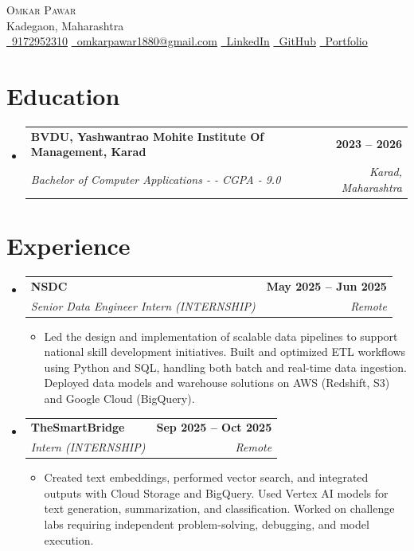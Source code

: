 \documentclass[letterpaper,11pt]{article}
\makeatletter
\newcommand{\resumeItem}[1]{
  \item\small{#1}
}
\newcommand{\resumeSubHeadingListStart}{\begin{itemize}[label={}]}
\newcommand{\resumeSubHeadingListEnd}{\end{itemize}}
\newcommand{\resumeItemListStart}{\begin{itemize}}
\newcommand{\resumeItemListEnd}{\end{itemize}}
\newcommand{\resumeSubheading}[4]{
  \item
  \begin{tabular*}{\textwidth}{l@{\extracolsep{\fill}}r}
    \textbf{#1} & \textbf{#2} \\
    \textit{#3} & \textit{#4}
  \end{tabular*}
}
\makeatother
\begin{document}
\begin{center}
  {\Huge \scshape Omkar Pawar} \\[2pt]
  Kadegaon, Maharashtra \\[6pt]

  \small
  \href{tel:9172952310}{\faPhone\ 9172952310}
  \quad
  \href{mailto:omkarpawar1880@gmail.com}{\faEnvelope\ omkarpawar1880@gmail.com}
  \quad
  \href{  }{\faLinkedin\ LinkedIn}
  \quad
  \href{  }{\faGithub\ GitHub}
  \quad
  \href{  }{\faGlobe\ Portfolio}
\end{center}

\section{Education}
\resumeSubHeadingListStart
\resumeSubheading{BVDU, Yashwantrao Mohite Institute Of Management, Karad}{2023 -- 2026}{Bachelor of Computer Applications -  - CGPA - 9.0}{Karad, Maharashtra}

\resumeSubHeadingListEnd

\section{Experience}
\resumeSubHeadingListStart
\resumeSubheading{NSDC}{May 2025 -- Jun 2025}{Senior Data Engineer Intern (INTERNSHIP)}{Remote}
\resumeItemListStart
\resumeItem{Led the design and implementation of scalable data pipelines to support national skill development initiatives. Built and optimized ETL workflows using Python and SQL, handling both batch and real-time data ingestion. Deployed data models and warehouse solutions on AWS (Redshift, S3) and Google Cloud (BigQuery).}
\resumeItemListEnd
\resumeSubheading{TheSmartBridge}{Sep 2025 -- Oct 2025}{Intern (INTERNSHIP)}{Remote}
\resumeItemListStart
\resumeItem{Created text embeddings, performed vector search, and integrated outputs with Cloud Storage and BigQuery. Used Vertex AI models for text generation, summarization, and classification. Worked on challenge labs requiring independent problem-solving, debugging, and model execution.}
\resumeItemListEnd

\resumeSubHeadingListEnd

\end{document}
